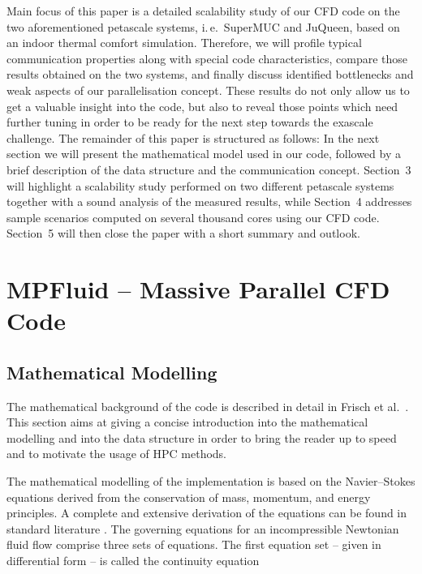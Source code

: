 \documentclass[10pt, conference, compsocconf]{IEEEtran}
\begin{document}
Main focus of this paper is a detailed scalability study of our CFD code on the two aforementioned petascale systems, i.\,e.\ SuperMUC and JuQueen, based on an indoor thermal comfort simulation. Therefore, we will profile typical communication properties along with special code characteristics, compare those results obtained on the two systems, and finally discuss identified bottlenecks and weak aspects of our parallelisation concept. These results do not only allow us to get a valuable insight into the code, but also to reveal those points which need further tuning in order to be ready for the next step towards the exascale challenge. The remainder of this paper is structured as follows: In the next section we will present the mathematical model used in our code, followed by a brief description of the data structure and the communication concept. Section~3 will highlight a scalability study performed on two different petascale systems together with a sound analysis of the measured results, while Section~4 addresses sample scenarios computed on several thousand cores using our CFD code. Section~5 will then close the paper with a short summary and outlook.

\section{MPFluid -- Massive Parallel CFD Code}
\label{sec:data_struct}

\subsection{Mathematical Modelling}

The mathematical background of the code is described in detail in Frisch et al.~\cite{Frisch2015Computation}. This section aims at giving a concise introduction into the mathematical modelling and into the data structure in order to bring the reader up to speed and to motivate the usage of HPC methods.

The mathematical modelling of the implementation is based on the Navier--Stokes equations derived from the conservation of mass, momentum, and energy principles. A complete and extensive derivation of the equations can be found in standard literature \cite{Batchelor2000, Ferziger2002, Hirsch2007}. The governing equations for an incompressible Newtonian fluid flow comprise three sets of equations. The first equation set -- given in differential form -- is called the continuity equation \vspace{-8pt}
\end{document}
